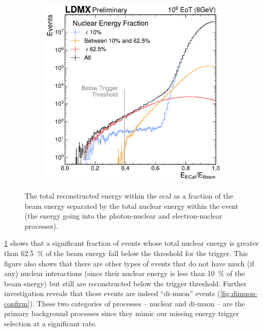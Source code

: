 \begin{figure}
\begin{subfigure}{0.48\textwidth}
    \includegraphics[width=\textwidth]{figures/ldmx/simulation/8gev-ecal-by-nuc.pdf}
  \end{subfigure}
  \caption{The total reconstructed energy within the \ac{ecal} as a fraction of the beam energy
  separated by the total nuclear energy within the event (the energy going into the photon-nuclear
  and electron-nuclear processes).}
  \label{fig:rec-efrac-by-nuc}
\end{figure}

\cref{fig:rec-efrac-by-nuc} shows that a significant fraction of events whose total nuclear
energy is greater than \qty{62.5}{\percent} of the beam energy fall below the threshold for
the trigger.
This figure also shows that there are other types of events that do not have much (if any)
nuclear interactions (since their nuclear energy is less than \qty{10}{\percent} of the beam
energy) but still are reconstructed below the trigger threshold.
Further investigation reveals that these events are indeed ``di-muon'' events (\cref{fig:dimuon-confirm}).
These two categories of processes -- nuclear and di-muon -- are the primary background
processes since they mimic our missing energy trigger selection at a significant rate.

